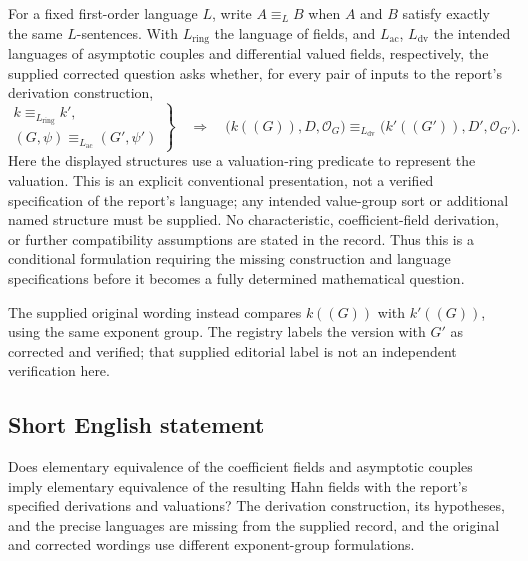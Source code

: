 \documentclass[11pt]{article}
\begin{document}
For a fixed first-order language \(L\), write \(A\equiv_L B\) when \(A\) and \(B\) satisfy exactly the same \(L\)-sentences. With \(L_{\mathrm{ring}}\) the language of fields, and \(L_{\mathrm{ac}}\), \(L_{\mathrm{dv}}\) the intended languages of asymptotic couples and differential valued fields, respectively, the supplied corrected question asks whether, for every pair of inputs to the report's derivation construction,
\[
\left.
\begin{gathered}
k\equiv_{L_{\mathrm{ring}}}k',\\
(G,\psi)\equiv_{L_{\mathrm{ac}}}(G',\psi')
\end{gathered}
\right\}
\quad\Longrightarrow\quad
\bigl(k((G)),D,\mathcal O_G\bigr)
\equiv_{L_{\mathrm{dv}}}
\bigl(k'((G')),D',\mathcal O_{G'}\bigr).
\]
Here the displayed structures use a valuation-ring predicate to represent the valuation. This is an explicit conventional presentation, not a verified specification of the report's language; any intended value-group sort or additional named structure must be supplied. No characteristic, coefficient-field derivation, or further compatibility assumptions are stated in the record. Thus this is a conditional formulation requiring the missing construction and language specifications before it becomes a fully determined mathematical question.

The supplied original wording instead compares \(k((G))\) with \(k'((G))\), using the same exponent group. The registry labels the version with \(G'\) as corrected and verified; that supplied editorial label is not an independent verification here.
\subsection{Short English statement}
Does elementary equivalence of the coefficient fields and asymptotic couples imply elementary equivalence of the resulting Hahn fields with the report's specified derivations and valuations? The derivation construction, its hypotheses, and the precise languages are missing from the supplied record, and the original and corrected wordings use different exponent-group formulations.
\end{document}
